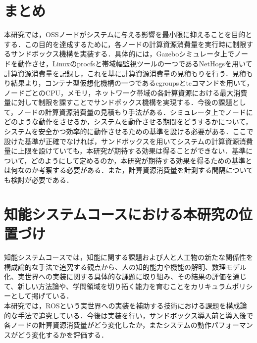 \documentclass[11pt]{ujarticle} %
\begin{document}
\section{まとめ}
本研究では，OSSノードがシステムに与える影響を最小限に抑えることを目的とする．この目的を達成するために，各ノードの計算資源消費量を実行時に制限するサンドボックス機構を実装する．具体的には，Gazeboシミュレータ上でノードを動作させ，Linuxのprocfsと帯域幅監視ツールの一つであるNetHogsを用いて計算資源消費量を記録し，これを基に計算資源消費量の見積もりを行う．見積もり結果より，コンテナ型仮想化機構の一つであるcgroupsとtcコマンドを用いて，ノードごとのCPU，メモリ，ネットワーク帯域の各計算資源における最大消費量に対して制限を課すことでサンドボックス機構を実現する．今後の課題として，ノードの計算資源消費量の見積もり手法がある．シミュレータ上でノードにどのような動作をさせるか，システムを動作させる期間をどうするかについて，システムを安全かつ効率的に動作させるための基準を設ける必要がある．ここで設けた基準が正確でなければ，サンドボックスを用いてシステムの計算資源消費量に上限を設けていても，本研究が期待する効果は得ることができない．基準について，どのようにして定めるのか，本研究が期待する効果を得るための基準とは何なのか考察する必要がある．また，計算資源消費量を計測する間隔についても検討が必要である．

\section{知能システムコースにおける本研究の位置づけ}
知能システムコースでは，知能に関する課題および人と人工物の新たな関係性を構成論的な手法で追究する観点から、人の知的能力や機能の解明、数理モデル化、実世界への実装に関する具体的な課題に取り組み、その結果の評価を通じて、新しい方法論や、学問領域を切り拓く能力を育むことをカリキュラムポリシーとして掲げている．\\本研究では，ROSという実世界への実装を補助する技術における課題を構成論的な手法で追究している．今後は実装を行い，サンドボックス導入前と導入後で各ノードの計算資源消費量がどう変化したか，またシステムの動作パフォーマンスがどう変化するかを評価する．

\end{document}
